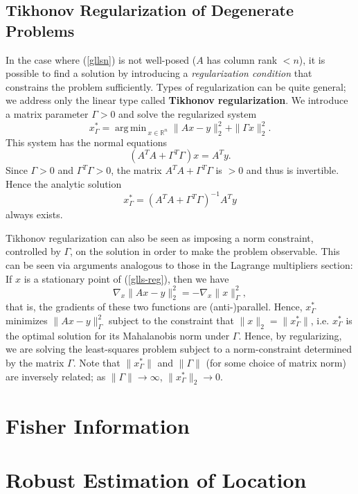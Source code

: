 \documentclass[reqno]{amsart}
\DeclareMathOperator*{\argmin}{arg\,min\,}
\numberwithin{equation}{section}
\begin{document}
\subsection{Tikhonov Regularization of Degenerate Problems}
In the case where (\ref{gllsn}) is not well-posed ($A$ has column rank $<n$), it is possible
to find a solution by introducing a \emph{regularization condition} that constrains the
problem sufficiently. Types of regularization can be quite general; we address only the linear
type called \textbf{Tikhonov regularization}.
We introduce a matrix parameter $\Gamma > 0$ and solve the regularized system
\begin{equation}
    x_{\Gamma}^* = \argmin_{x \in \mathbb R^n} \|Ax - y\|_2^2 + \|\Gamma x\|_2^2.
\label{glls-reg}
\end{equation}
This system has the normal equations
\begin{equation}
    (A^TA + \Gamma^T\Gamma) x = A^Ty.
\label{normal-reg}
\end{equation}
Since $\Gamma > 0$ and $\Gamma^T\Gamma > 0$, the matrix $A^TA + \Gamma^T\Gamma$ is $> 0$ and thus
is invertible. Hence the analytic solution
$$
    x^*_{\Gamma} = (A^TA + \Gamma^T\Gamma)^{-1}A^Ty
$$
always exists.

Tikhonov regularization can also be seen as imposing a norm constraint, controlled by $\Gamma$, on
the solution in order to make the problem observable. This can be seen via arguments analogous
to those in the Lagrange multipliers section: If $x$ is a stationary point of
(\ref{glls-reg}), then we have
$$
    \nabla_x \| Ax - y \|_2^2 = -\nabla_x \| x \|_{\Gamma}^2,
$$
that is, the gradients of these two functions are (anti-)parallel. Hence, $x^*_{\Gamma}$ minimizes
$\|Ax - y\|_{\Gamma}^2$ subject to the constraint that $\| x \|_2 = \|x^*_{\Gamma}\|$, i.e.
$x^*_{\Gamma}$ is the optimal solution for its Mahalanobis norm under $\Gamma$. Hence, by
regularizing, we are solving the least-squares problem subject to a norm-constraint determined
by the matrix $\Gamma$. Note that $\|x^*_{\Gamma}\|$
and $\|\Gamma\|$ (for some choice of matrix norm) are inversely related; as
$\|\Gamma\| \to \infty$, $\|x^*_\Gamma\|_2 \to 0$.

\section{Fisher Information}

\section {Robust Estimation of Location}
\end{document}
